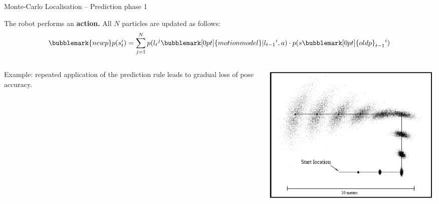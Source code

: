 \documentclass[compress]{beamer}
\begin{document}
\begin{frame}{Monte-Carlo Localisation -- Prediction phase 1}

The robot performs an \textbf{action.} All $N$ particles are
    updated as follows:
    \Large
        \[ 
        \bubblemark{newp}p(s_t^i) = \sum_{j=1}^N
        p(l_t{}^j\bubblemark[0pt]{motionmodel}|l_{t-1}{}^i, a) \cdot p(s\bubblemark[0pt]{oldp}_{t-1}{}^i)
        \]
    \normalsize
    \begin{columns}
        \begin{column}{0.5\linewidth}
Example: repeated application of the prediction rule leads to gradual
  loss of pose accuracy.
        \end{column}
        \begin{column}{0.5\linewidth}
            \begin{center}
                \includegraphics[width=\linewidth]{mcl_prediction}
            \end{center}
        \end{column}
    \end{columns}




\end{frame}
\end{document}
